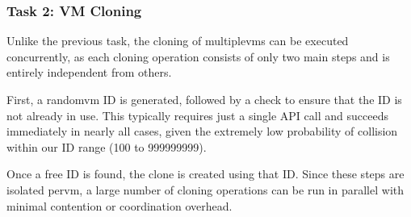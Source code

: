        \subsubsection{Task 2: VM Cloning}            
            Unlike the previous task, the cloning of multiple\ac{vm}s can be executed concurrently, as each cloning operation 
            consists of only two main steps and is entirely independent from others.

            First, a random\ac{vm} ID is generated, followed by a check to ensure that the ID is not already in use. This 
            typically requires just a single API call and succeeds immediately in nearly all cases, given the extremely low 
            probability of collision within our ID range (100 to 999999999).

            Once a free ID is found, the clone is created using that ID. Since these steps are isolated per\ac{vm}, a large 
            number of cloning operations can be run in parallel with minimal contention or coordination overhead.

